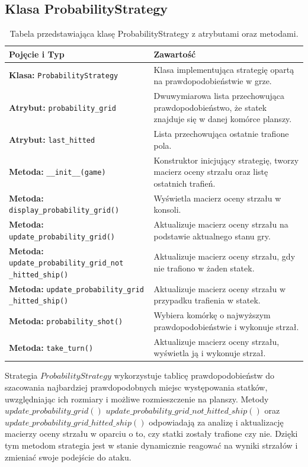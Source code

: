 \documentclass[magisterska]{pracadypl}
\begin{document}
{\subsection{Klasa ProbabilityStrategy}
\begin{table}[H]
\centering
\begin{tabularx}{\textwidth}{|p{6cm}|X|}
\hline
\textbf{Pojęcie i Typ} & \textbf{Zawartość} \\ \hline
\textbf{Klasa:} \texttt{ProbabilityStrategy} & Klasa implementująca strategię opartą na prawdopodobieństwie w grze. \\ \hline
\textbf{Atrybut:} \texttt{probability\_grid} & Dwuwymiarowa lista przechowująca prawdopodobieństwo, że statek znajduje się w danej komórce planszy. \\ \hline
\textbf{Atrybut:} \texttt{last\_hitted} & Lista przechowująca ostatnie trafione pola. \\ \hline
\textbf{Metoda:} \texttt{\_\_init\_\_(game)} & Konstruktor inicjujący strategię, tworzy macierz oceny strzału oraz listę ostatnich trafień. \\ \hline
\textbf{Metoda:} \texttt{display\_probability\_grid()} & Wyświetla macierz oceny strzału w konsoli. \\ \hline
\textbf{Metoda:} \texttt{update\_probability\_grid()} & Aktualizuje macierz oceny strzału na podstawie aktualnego stanu gry. \\ \hline
\textbf{Metoda:} \texttt{update\_probability\_grid\_not \_hitted\_ship()} & Aktualizuje macierz oceny strzału, gdy nie trafiono w żaden statek. \\ \hline
\textbf{Metoda:} \texttt{update\_probability\_grid \_hitted\_ship()} & Aktualizuje macierz oceny strzału w przypadku trafienia w statek. \\ \hline
\textbf{Metoda:} \texttt{probability\_shot()} & Wybiera komórkę o najwyższym prawdopodobieństwie i wykonuje strzał. \\ \hline
\textbf{Metoda:} \texttt{take\_turn()} & Aktualizuje macierz oceny strzału, wyświetla ją i wykonuje strzał. \\ \hline
\end{tabularx}
\caption{Tabela przedstawiająca klasę ProbabilityStrategy z atrybutami oraz metodami.}
\end{table}

Strategia $ProbabilityStrategy$ wykorzystuje tablicę prawdopodobieństw do szacowania najbardziej prawdopodobnych miejsc występowania statków, uwzględniając ich rozmiary i możliwe rozmieszczenie na planszy. Metody ${update\_probability\_grid()}$ \newline ${update\_probability\_grid\_not\_hitted\_ship() }$ oraz $ update\_probability\_grid\_hitted\_ship() $ odpowiadają za analizę i aktualizację macierzy oceny strzału w oparciu o to, czy statki zostały trafione czy nie. Dzięki tym metodom strategia jest w stanie dynamicznie reagować na wyniki strzałów i zmieniać swoje podejście do ataku.
}
\end{document}
